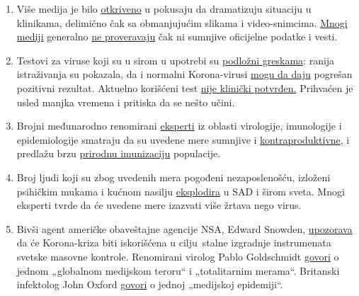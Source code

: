\begin{enumerate}
{  kuće}.
\item
  Više medija je bilo
  \href{https://nypost.com/2020/04/01/cbs-admits-to-using-footage-from-italy-in-report-about-nyc/}{otkriveno}
  u pokusaju da dramatizuju situaciju u klinikama, delimično čak sa
  obmanjujućim slikama i video-snimcima.
  \href{https://www.deutschlandfunk.de/die-nachrichten-kulturnachrichten.2792.de.html}{Mnogi
  mediji} generalno
  \href{https://swprs.org/das-bag-im-corona-fieber/}{ne proveravaju} čak
  ni sumnjive oficijelne podatke i vesti.
\item
  Testovi za viruse koji su u sirom u upotrebi su
  \href{https://www.ncbi.nlm.nih.gov/pubmed/32219885}{podložni
  greskama}: ranija istraživanja su pokazala, da i normalni
  Korona-virusi
  \href{https://www.ncbi.nlm.nih.gov/pmc/articles/PMC2095096/}{mogu da
  daju} pogrešan pozitivni rezultat. Aktuelno korišćeni test
  \href{https://www.youtube.com/watch?v=p_AyuhbnPOI}{nije klinički
  potvrđen.} Prihvaćen je usled manjka vremena i pritiska da se nešto
  učini.
\item
  Brojni međunarodno renomirani
  \href{https://off-guardian.org/2020/03/24/12-experts-questioning-the-coronavirus-panic/}{eksperti}
  iz oblasti virologije, imunologije i epidemiologije smatraju da su
  uvedene mere sumnjive i
  \href{https://off-guardian.org/2020/03/28/10-more-experts-criticising-the-coronavirus-panic/}{kontraproduktivne},
  i predlažu brzu
  \href{https://off-guardian.org/2020/04/08/watch-perspectives-on-the-pandemic-2/}{prirodnu
  imunizaciju} populacije.
\item
  Broj ljudi koji su zbog uvedenih mera pogođeni nezaposlenošću,
  izloženi psihičkim mukama i kućnom nasilju
  \href{https://www.reuters.com/article/us-health-coronavirus-usa-layoffs/us-weekly-jobless-claims-seen-at-record-high-again-idUSKBN21K0FX}{eksplodira}
  u SAD i širom sveta. Mnogi eksperti tvrde da će uvedene mere izazvati
  više žrtava nego virus.
\item
  Bivši agent američke obaveštajne agencije NSA, Edward Snowden,
  \href{https://www.youtube.com/watch?v=-pcQFTzck_c}{upozorava} da će
  Korona-kriza biti iskorišćena u cilju~stalne izgradnje instrumenata
  svetske masovne kontrole. Renomirani virolog Pablo Goldschmidt
  \href{https://www.rubikon.news/artikel/der-corona-totalitarismus}{govori}
  o jednom „globalnom medijskom teroru`` i „totalitarnim merama``.
  Britanski infektolog John Oxford
  \href{https://novuscomms.com/2020/03/31/a-view-from-the-hvivo-open-orphan-orph-laboratory-professor-john-oxford/}{govori}
  o jednoj „medijskoj epidemiji``.
\end{enumerate}

